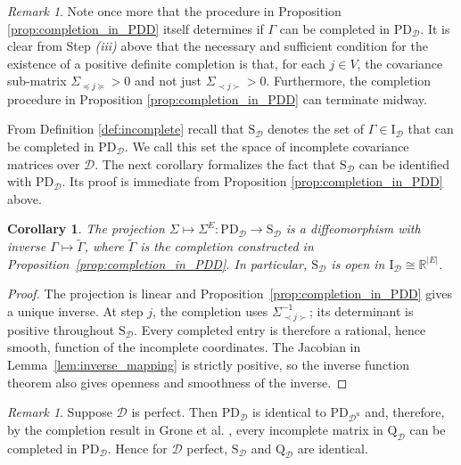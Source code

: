 \documentclass[12pt]{article}
\newcommand{\R}{\mathbb{R}}
\newcommand{\D}{\mathcal{D}}
\theoremstyle{plain}
\newtheorem{corollary}[theorem]{Corollary}
\theoremstyle{definition}
\theoremstyle{remark}
\newtheorem{Rem}[theorem]{Remark}
\begin{document}
%
\begin{Rem}
Note once more that the procedure in Proposition \ref{prop:completion_in_PDD} itself determines if $\Gamma$ can be completed in $\mathrm{PD}_{\D}$. It is clear from Step {\it(iii)} above that the necessary and sufficient condition for the existence of a positive definite completion is that, for each $j\in V$, the covariance sub-matrix $\Sigma_{\preceq j\succeq}> 0$ and not just  $\Sigma_{\prec j \succ}>0$. Furthermore, the completion procedure in Proposition \ref{prop:completion_in_PDD} can terminate midway.
\end{Rem}
%
%
From Definition \ref{def:incomplete} recall that $\mathrm{S}_{\D}$ denotes the set of $\Gamma\in \mathrm{I}_{\D}$ that can be completed in $\mathrm{PD}_{\D}$. We call this set the space of incomplete covariance matrices over $\D$. The next corollary formalizes the fact that $\mathrm{S}_{\D}$ can be identified with $\mathrm{PD}_{\D}$.
Its proof is immediate from Proposition  \ref{prop:completion_in_PDD} above. 
\begin{corollary}\label{cor:pdd_sd}
The projection
$\Sigma\mapsto\Sigma^E:\mathrm{PD}_{\D}\rightarrow\mathrm S_{\D}$
is a diffeomorphism with inverse
$\Gamma\mapsto\widetilde\Gamma$, where $\widetilde\Gamma$ is the
completion constructed in Proposition~\ref{prop:completion_in_PDD}.
In particular, $\mathrm S_{\D}$ is open in
$\mathrm I_{\D}\cong\R^{|E|}$.
\end{corollary}
\begin{proof}
The projection is linear and Proposition~\ref{prop:completion_in_PDD}
gives a unique inverse.  At step $j$, the completion uses
$\Sigma_{\prec j\succ}^{-1}$; its determinant is positive throughout
$\mathrm S_{\D}$.  Every completed entry is therefore a rational,
hence smooth, function of the incomplete coordinates.  The Jacobian in
Lemma~\ref{lem:inverse_mapping} is strictly positive, so the inverse
function theorem also gives openness and smoothness of the inverse.
\end{proof}
%
\begin{Rem}\label{rem:QG_SG}
Suppose $\D$ is perfect. Then $\mathrm{PD}_{\D}$ is identical to $\mathrm{PD}_{\D^{\mathrm{u}}}$ and, therefore, by the completion result in Grone et al. \cite{Grone84}, every incomplete matrix in $\mathrm{Q}_{\D}$  can be completed in $\mathrm{PD}_{\D}$. Hence for $\D$ perfect, $\mathrm{S}_{\D}$ and $\mathrm{Q}_{\D}$ are identical.
\end{Rem}
%


\end{document}
